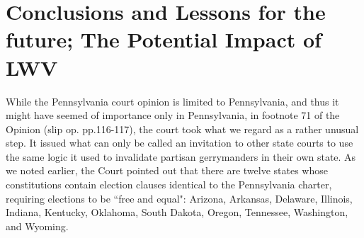 \section{Conclusions and Lessons for the future; The Potential Impact of LWV}
%
%
While the Pennsylvania court opinion is limited to Pennsylvania, and thus it might have seemed of importance only in Pennsylvania, in footnote 71 of the Opinion (slip op. pp.116-117), the court took what we regard as a rather unusual step. It issued what can only be called an invitation to other state courts to use the same logic it used to invalidate partisan gerrymanders in their own state. As we noted earlier, the Court pointed out that there are twelve states whose constitutions contain election clauses identical to the Pennsylvania charter, requiring elections to be ``free and equal": Arizona, Arkansas, Delaware, Illinois, Indiana, Kentucky, Oklahoma, South Dakota, Oregon, Tennessee, Washington, and Wyoming.

